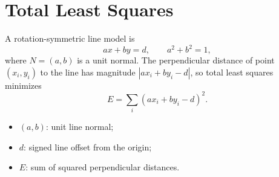 \documentclass[11pt,a4paper,oneside]{report}
\newcommand{\mathlegend}[1]{%
  \par\vspace{0.2em}{\small\itshape where}\par
  \begin{itemize}[leftmargin=1.7em,topsep=0.15em,itemsep=0.12em]
  #1
  \end{itemize}
}
\begin{document}
\section{Total Least Squares}

A rotation-symmetric line model is
\begin{equation}
  ax+by=d,\qquad a^2+b^2=1,
  \label{eq:tls-line}
\end{equation}
where $N=(a,b)$ is a unit normal. The perpendicular distance of point $(x_i,y_i)$ to the line has magnitude $|ax_i+by_i-d|$, so total least squares minimizes
\begin{equation}
  E=\sum_i(ax_i+by_i-d)^2.
  \label{eq:tls-error}
\end{equation}
\mathlegend{
  \item $(a,b)$: unit line normal;
  \item $d$: signed line offset from the origin;
  \item $E$: sum of squared perpendicular distances.
}
\end{document}
